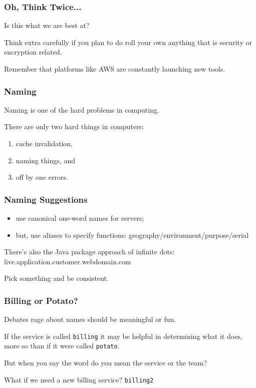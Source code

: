 \begin{frame}
\frametitle{Oh, Think Twice...}

Is this what we are best at?

Think extra carefully if you plan to do roll your own anything that is security or encryption related.

Remember that platforms like AWS are constantly launching new tools.

\end{frame}

\begin{frame}
\frametitle{Naming}

\Large

Naming is one of the hard problems in computing. 

There are only two hard things in computers:
\begin{enumerate}
\item cache invalidation,
\item naming things, and
\item off by one errors.
\end{enumerate}

\end{frame}



\begin{frame}
\frametitle{Naming Suggestions}

\large

\begin{itemize}
\item use canonical one-word names for servers;
\item but, use aliases to specify functions: geography/environment/purpose/serial
\end{itemize}


There's also the Java package approach of infinite dots: live.application.customer.webdomain.com

Pick something and be consistent.

\end{frame}


\begin{frame}
\frametitle{Billing or Potato?}

Debates rage about names should be meaningful or fun.

If the service is called \texttt{billing} it may be helpful in determining what it does, more so than if it were called \texttt{potato}.

But when you say the word do you mean the service or the team?

What if we need a new billing service? \texttt{billing2}

\end{frame}


